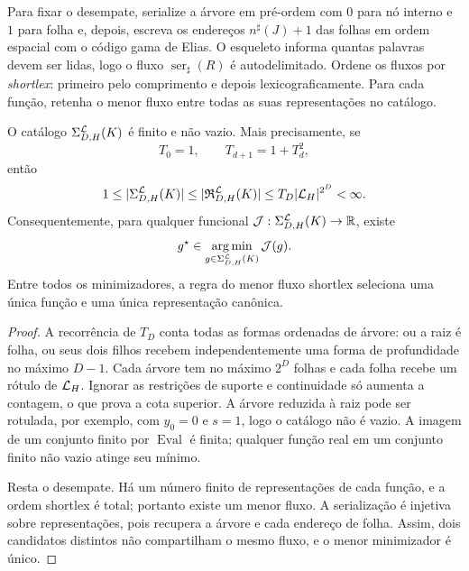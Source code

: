 Para fixar o desempate, serialize a árvore em pré-ordem com $0$ para nó
interno e $1$ para folha e, depois, escreva os endereços
$n^\sharp(J)+1$ das folhas em ordem espacial com o código gama de Elias. O
esqueleto informa quantas palavras devem ser lidas, logo o fluxo
$\operatorname{ser}_\sharp(R)$ é autodelimitado. Ordene os fluxos por
\emph{shortlex}: primeiro pelo comprimento e depois lexicograficamente. Para
cada função, retenha o menor fluxo entre todas as suas representações no
catálogo.

\begin{theorem}
\label{thm:finite-catalog-minimizer}
O catálogo $\Sigma_{D,H}^{\mathcal{L}}(K)$ é finito e não vazio. Mais
precisamente, se
\[
 T_0=1,\qquad T_{d+1}=1+T_d^2,
\]
então
\begin{equation}
 1\le |\Sigma_{D,H}^{\mathcal{L}}(K)|
 \le |\mathfrak R_{D,H}^{\mathcal{L}}(K)|
 \le T_D|\mathcal{L}_H|^{2^D}<\infty.
 \label{eq:finite-catalog-bound}
\end{equation}
Consequentemente, para qualquer funcional
$\mathcal J:\Sigma_{D,H}^{\mathcal{L}}(K)\to\mathbb R$, existe
\begin{equation}
 g^\star\in\operatorname*{arg\,min}_{g\in\Sigma_{D,H}^{\mathcal{L}}(K)}\mathcal J(g).
 \label{eq:finite-argmin}
\end{equation}
Entre todos os minimizadores, a regra do menor fluxo shortlex seleciona uma
única função e uma única representação canônica.
\end{theorem}

\begin{proof}
A recorrência de $T_D$ conta todas as formas ordenadas de árvore: ou a raiz é
folha, ou seus dois filhos recebem independentemente uma forma de profundidade
no máximo $D-1$. Cada árvore tem no máximo $2^D$ folhas e cada folha recebe
um rótulo de $\mathcal{L}_H$. Ignorar as restrições de suporte e continuidade só
aumenta a contagem, o que prova a cota superior. A árvore reduzida à raiz pode
ser rotulada, por exemplo, com $y_0=0$ e $s=1$, logo o catálogo não é vazio.
A imagem de um conjunto finito por $\operatorname{Eval}$ é finita; qualquer
função real em um conjunto finito não vazio atinge seu mínimo.

Resta o desempate. Há um número finito de representações de cada função, e a
ordem shortlex é total; portanto existe um menor fluxo. A serialização é
injetiva sobre representações, pois recupera a árvore e cada endereço de
folha. Assim, dois candidatos distintos não compartilham o mesmo fluxo, e o
menor minimizador é único.
\end{proof}

